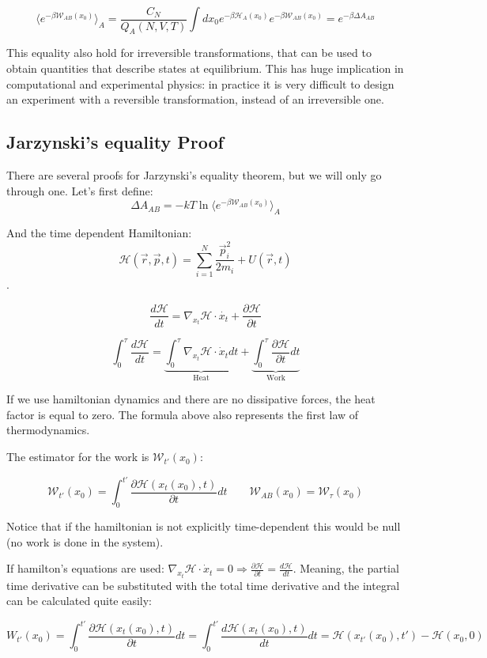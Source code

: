 $$\langle e^{-\beta\mathcal{W}_{AB}(x_0)}\rangle_A = \frac{C_N}{Q_A(N, V, T)}\int dx_0e^{-\beta\mathcal{H}_A(x_0)}e^{-\beta\mathcal{W}_{AB}(x_0)} = e^{-\beta\Delta A_{AB}}$$

This equality also hold for irreversible transformations, that can be used to obtain quantities that describe states at equilibrium.
This has huge implication in computational and experimental physics: in practice it is very difficult to design an experiment with a reversible transformation, instead of an irreversible one.

\subsection{Jarzynski's equality Proof}
There are several proofs for Jarzynski's equality theorem, but we will only go through one.
Let's first define:
$$\Delta A_{AB} = -kT\ln\langle e^{-\beta\mathcal{W}_{AB}(x_0)}\rangle_A$$

And the time dependent Hamiltonian: 
$$\mathcal{H}(\vec{r}, \vec{p}, t) = \sum\limits_{i=1}^N\frac{\vec{p}_i^2}{2m_i} + U(\vec{r}, t)$$.

$$\frac{d\mathcal{H}}{dt} = \nabla_{x_t}\mathcal{H}\cdot\dot{x_t}+\frac{\partial\mathcal{H}}{\partial t}$$

$$\int_0^\tau\frac{d\mathcal{H}}{dt} = \underbrace{\int_0^\tau\nabla_{x_t}\mathcal{H}\cdot\dot{x}_tdt}_{\text{Heat}}+\underbrace{\int_0^\tau\frac{\partial\mathcal{H}}{\partial t}dt}_{\text{Work}}$$

If we use hamiltonian dynamics and there are no dissipative forces, the heat factor is equal to zero.
The formula above also represents the first law of thermodynamics.

The estimator for the work is $\mathcal{W}_{t'}(x_0)$:

$$\mathcal{W}_{t'}(x_0) = \int_0^{t'}\frac{\partial\mathcal{H}(x_t(x_0), t)}{\partial t}dt\qquad \mathcal{W}_{AB}(x_0) = \mathcal{W}_\tau(x_0)$$

Notice that if the hamiltonian is not explicitly time-dependent this would be null (no work is done in the system).

If hamilton's equations are used: $\nabla_{x_t}\mathcal{H}\cdot\dot{x}_t = 0\Rightarrow\frac{\partial\mathcal{H}}{\partial t} = \frac{d\mathcal{H}}{dt}$. 
Meaning, the partial time derivative can be substituted with the total time derivative and the integral can be calculated quite easily: 

$$W_{t'}(x_0) = \int_0^{t'}\frac{\partial\mathcal{H}(x_t(x_0),t)}{\partial t}dt = \int_0^{t'}\frac{d\mathcal{H}(x_t(x_0), t)}{dt}dt = \mathcal{H}(x_{t'}(x_0), t') - \mathcal{H}(x_0, 0)$$

